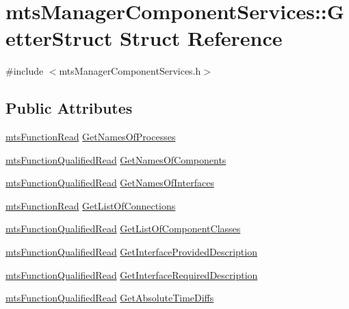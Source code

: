 \hypertarget{structmts_manager_component_services_1_1_getter_struct}{}\section{mts\+Manager\+Component\+Services\+:\+:Getter\+Struct Struct Reference}
\label{structmts_manager_component_services_1_1_getter_struct}


{\ttfamily \#include $<$mts\+Manager\+Component\+Services.\+h$>$}

\subsection*{Public Attributes}
\begin{DoxyCompactItemize}
\item 
\hyperlink{classmts_function_read}{mts\+Function\+Read} \hyperlink{structmts_manager_component_services_1_1_getter_struct_a1873270501352f0f330b0d21f555956c}{Get\+Names\+Of\+Processes}
\item 
\hyperlink{classmts_function_qualified_read}{mts\+Function\+Qualified\+Read} \hyperlink{structmts_manager_component_services_1_1_getter_struct_ae997570edfaea8189ee50a91cfaa1359}{Get\+Names\+Of\+Components}
\item 
\hyperlink{classmts_function_qualified_read}{mts\+Function\+Qualified\+Read} \hyperlink{structmts_manager_component_services_1_1_getter_struct_a0783d016f0e0dc078a89769f2b66f334}{Get\+Names\+Of\+Interfaces}
\item 
\hyperlink{classmts_function_read}{mts\+Function\+Read} \hyperlink{structmts_manager_component_services_1_1_getter_struct_ad44d9caf632a09337d33be8c33d7fe89}{Get\+List\+Of\+Connections}
\item 
\hyperlink{classmts_function_qualified_read}{mts\+Function\+Qualified\+Read} \hyperlink{structmts_manager_component_services_1_1_getter_struct_a8cd33a8253674d0c5c6aa75b0deedba6}{Get\+List\+Of\+Component\+Classes}
\item 
\hyperlink{classmts_function_qualified_read}{mts\+Function\+Qualified\+Read} \hyperlink{structmts_manager_component_services_1_1_getter_struct_a8b792e00dd8c61dc8c80a313ebd9e60c}{Get\+Interface\+Provided\+Description}
\item 
\hyperlink{classmts_function_qualified_read}{mts\+Function\+Qualified\+Read} \hyperlink{structmts_manager_component_services_1_1_getter_struct_a9cd971194963a0674ca99a6021039398}{Get\+Interface\+Required\+Description}
\item 
\hyperlink{classmts_function_qualified_read}{mts\+Function\+Qualified\+Read} \hyperlink{structmts_manager_component_services_1_1_getter_struct_a79a87f5fcd590947491f8c68fcb2705e}{Get\+Absolute\+Time\+Diffs}
\end{DoxyCompactItemize}


